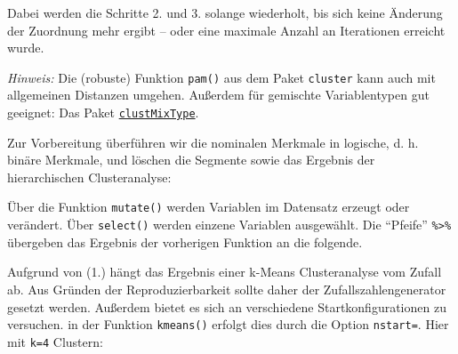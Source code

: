 \documentclass[12pt,ngerman,]{book}
\newenvironment{Shaded}{\begin{snugshade}}{\end{snugshade}}
\newcommand{\KeywordTok}[1]{\textcolor[rgb]{0.13,0.29,0.53}{\textbf{{#1}}}}
\newcommand{\DataTypeTok}[1]{\textcolor[rgb]{0.13,0.29,0.53}{{#1}}}
\newcommand{\StringTok}[1]{\textcolor[rgb]{0.31,0.60,0.02}{{#1}}}
\newcommand{\NormalTok}[1]{{#1}}
\renewenvironment{Shaded}{\begin{kframe}}{\end{kframe}}
\begin{document}
Dabei werden die Schritte 2. und 3. solange wiederholt, bis sich keine
Änderung der Zuordnung mehr ergibt -- oder eine maximale Anzahl an
Iterationen erreicht wurde.

\emph{Hinweis:} Die (robuste) Funktion \texttt{pam()} aus dem Paket
\texttt{cluster} kann auch mit allgemeinen Distanzen umgehen. Außerdem
für gemischte Variablentypen gut geeignet: Das Paket
\href{https://cran.r-project.org/web/packages/clustMixType/index.html}{\texttt{clustMixType}}.

Zur Vorbereitung überführen wir die nominalen Merkmale in logische, d.
h. binäre Merkmale, und löschen die Segmente sowie das Ergebnis der
hierarchischen Clusteranalyse:

\begin{Shaded}
\end{Shaded}

Über die Funktion \texttt{mutate()} werden Variablen im Datensatz
erzeugt oder verändert. Über \texttt{select()} werden einzene Variablen
ausgewählt. Die ``Pfeife'' \texttt{\%\textgreater{}\%} übergeben das
Ergebnis der vorherigen Funktion an die folgende.

Aufgrund von (1.) hängt das Ergebnis einer k-Means Clusteranalyse vom
Zufall ab. Aus Gründen der Reproduzierbarkeit sollte daher der
Zufallszahlengenerator gesetzt werden. Außerdem bietet es sich an
verschiedene Startkonfigurationen zu versuchen. in der Funktion
\texttt{kmeans()} erfolgt dies durch die Option \texttt{nstart=}. Hier
mit \texttt{k=4} Clustern:
\end{document}
